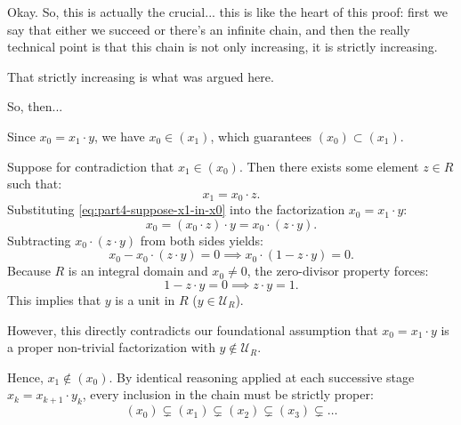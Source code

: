 \begin{proofWrapper}
\begin{speech}[01:07:11 - 01:09:39]
Okay. So, this is actually the crucial... this is like the heart of this proof: first we say that either we succeed or there's an infinite chain, and then the really technical point is that this chain is not only increasing, it is strictly increasing.

That strictly increasing is what was argued here. 

So, then...
\end{speech}

\begin{content}

Since $x_0 = x_1 \cdot y$, we have $x_0 \in (x_1)$, which guarantees $(x_0) \subset (x_1)$.

Suppose for contradiction that $x_1 \in (x_0)$. Then there exists some element $z \in R$ such that:
\begin{equation}\label{eq:part4-suppose-x1-in-x0}
x_1 = x_0 \cdot z.
\end{equation}
Substituting \eqref{eq:part4-suppose-x1-in-x0} into the factorization $x_0 = x_1 \cdot y$:
\begin{equation}\label{eq:part4-subst-cancel}
x_0 = (x_0 \cdot z) \cdot y = x_0 \cdot (z \cdot y).
\end{equation}
Subtracting $x_0 \cdot (z \cdot y)$ from both sides yields:
\begin{equation}\label{eq:part4-cancel-domain}
x_0 - x_0 \cdot (z \cdot y) = 0 \implies x_0 \cdot (1 - z \cdot y) = 0.
\end{equation}
Because $R$ is an integral domain and $x_0 \neq 0$, the zero-divisor property forces:
\begin{equation}\label{eq:part4-zy-one}
1 - z \cdot y = 0 \implies z \cdot y = 1.
\end{equation}
This implies that $y$ is a unit in $R$ ($y \in \mathcal{U}_R$).

However, this directly contradicts our foundational assumption that $x_0 = x_1 \cdot y$ is a proper non-trivial factorization with $y \notin \mathcal{U}_R$.

Hence, $x_1 \notin (x_0)$. By identical reasoning applied at each successive stage $x_k = x_{k+1} \cdot y_k$, every inclusion in the chain must be strictly proper:
\begin{equation}\label{eq:part4-strictly-ascending-chain}
(x_0) \subsetneq (x_1) \subsetneq (x_2) \subsetneq (x_3) \subsetneq \dots
\end{equation}
\end{content}


\end{proofWrapper}
